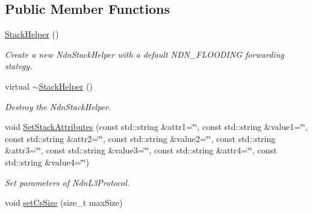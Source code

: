 \subsection*{Public Member Functions}
\begin{DoxyCompactItemize}
\item 
\hyperlink{classns3_1_1ndn_1_1StackHelper_a8c17ed7a1665d4503ed6ee47e3c5308d}{Stack\+Helper} ()\hypertarget{classns3_1_1ndn_1_1StackHelper_a8c17ed7a1665d4503ed6ee47e3c5308d}{}\label{classns3_1_1ndn_1_1StackHelper_a8c17ed7a1665d4503ed6ee47e3c5308d}

\begin{DoxyCompactList}\small\item\em Create a new Ndn\+Stack\+Helper with a default N\+D\+N\+\_\+\+F\+L\+O\+O\+D\+I\+NG forwarding stategy. \end{DoxyCompactList}\item 
virtual \hyperlink{classns3_1_1ndn_1_1StackHelper_aebb67f0d5c7819b33bb511b4bcb15bb6}{$\sim$\+Stack\+Helper} ()\hypertarget{classns3_1_1ndn_1_1StackHelper_aebb67f0d5c7819b33bb511b4bcb15bb6}{}\label{classns3_1_1ndn_1_1StackHelper_aebb67f0d5c7819b33bb511b4bcb15bb6}

\begin{DoxyCompactList}\small\item\em Destroy the Ndn\+Stack\+Helper. \end{DoxyCompactList}\item 
void \hyperlink{classns3_1_1ndn_1_1StackHelper_afcb65d0ee1b450bdce0be7de475700a8}{Set\+Stack\+Attributes} (const std\+::string \&attr1=\char`\"{}\char`\"{}, const std\+::string \&value1=\char`\"{}\char`\"{}, const std\+::string \&attr2=\char`\"{}\char`\"{}, const std\+::string \&value2=\char`\"{}\char`\"{}, const std\+::string \&attr3=\char`\"{}\char`\"{}, const std\+::string \&value3=\char`\"{}\char`\"{}, const std\+::string \&attr4=\char`\"{}\char`\"{}, const std\+::string \&value4=\char`\"{}\char`\"{})\hypertarget{classns3_1_1ndn_1_1StackHelper_afcb65d0ee1b450bdce0be7de475700a8}{}\label{classns3_1_1ndn_1_1StackHelper_afcb65d0ee1b450bdce0be7de475700a8}

\begin{DoxyCompactList}\small\item\em Set parameters of Ndn\+L3\+Protocol. \end{DoxyCompactList}\item 
void \hyperlink{classns3_1_1ndn_1_1StackHelper_ad536727f50460d9f00fbc08683039171}{set\+Cs\+Size} (size\+\_\+t max\+Size)\hypertarget{classns3_1_1ndn_1_1StackHelper_ad536727f50460d9f00fbc08683039171}{}\label{classns3_1_1ndn_1_1StackHelper_ad536727f50460d9f00fbc08683039171}


\end{DoxyCompactItemize}
